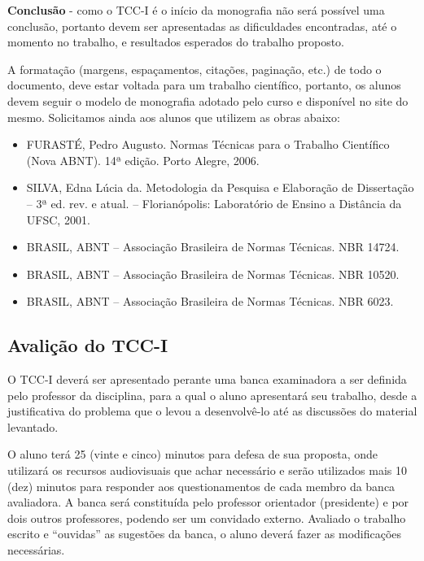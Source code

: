 \textbf{Conclusão} - como o TCC-I é o início da monografia não será possível uma conclusão, portanto devem ser apresentadas as dificuldades encontradas, até o momento no trabalho, e resultados esperados do trabalho proposto.

A formatação (margens, espaçamentos, citações, paginação, etc.) de todo o documento, deve estar voltada para um trabalho científico, portanto, 
os alunos devem seguir o modelo de monografia adotado pelo curso e disponível no site do mesmo. 
Solicitamos ainda aos alunos que utilizem as obras abaixo:

	\begin{itemize}	
		\item  FURASTÉ, Pedro Augusto. Normas Técnicas para o Trabalho Científico (Nova ABNT). 14ª edição. Porto Alegre, 2006.

		\item SILVA, Edna Lúcia da. Metodologia da Pesquisa e Elaboração de Dissertação – 3ª ed. rev. e atual. – Florianópolis: Laboratório de Ensino a Distância da 			UFSC, 2001.

		\item BRASIL, ABNT – Associação Brasileira de Normas Técnicas. NBR 14724.

		\item BRASIL, ABNT – Associação Brasileira de Normas Técnicas. NBR 10520.

		\item BRASIL, ABNT – Associação Brasileira de Normas Técnicas. NBR 6023.
	\end{itemize}
	

\subsection{Avalição do TCC-I}

O TCC-I deverá ser apresentado perante uma banca examinadora a ser definida pelo professor da disciplina, para a qual o aluno apresentará seu trabalho, desde a justificativa do problema que o levou a desenvolvê-lo até as discussões do material levantado.

O aluno terá 25 (vinte e cinco) minutos para defesa de sua proposta, onde utilizará os recursos audiovisuais que achar necessário e serão utilizados mais 10 (dez) minutos para responder aos questionamentos de cada membro da banca avaliadora. A banca será constituída pelo professor orientador (presidente) e por dois outros professores, podendo ser um convidado externo. Avaliado o trabalho escrito e “ouvidas” as sugestões da banca, o aluno deverá fazer as modificações necessárias.

